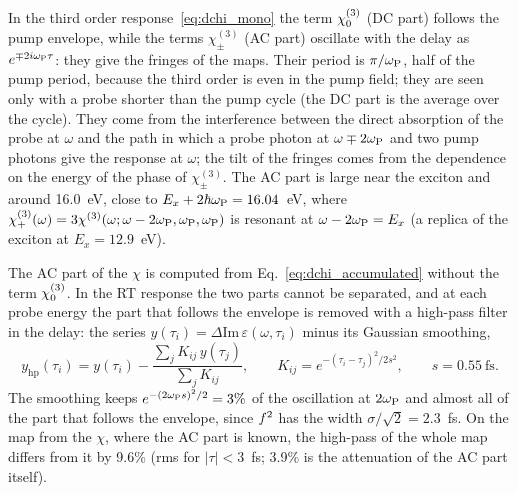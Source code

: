 \documentclass[10pt,a4paper]{paper}
\begin{document}
In the third order response~\eqref{eq:dchi_mono} the term $\chi^{(3)}_{0}$ (DC part) follows the pump envelope, while the
terms $\chi^{(3)}_\pm$ (AC part) oscillate with the delay as $e^{\mp2i\omega_{\mathrm{P}}\tau}$: they give the fringes of the maps.
Their period is $\pi/\omega_{\mathrm{P}}$, half of the pump period, because the third order is even in the pump field; they are seen
only with a probe shorter than the pump cycle (the DC part is the average over the cycle). They come from the
interference between the direct absorption of the probe at $\omega$ and the path in which a probe photon at
$\omega\mp2\omega_{\mathrm{P}}$ and two pump photons give the response at $\omega$; the tilt of the fringes comes from the dependence on
the energy of the phase of $\chi^{(3)}_\pm$. The AC part is large near the exciton and around 16.0~eV, close to
$E_x+2\hbar\omega_{\mathrm{P}} = 16.04$~eV, where $\chi^{(3)}_{+}(\omega) = 3\chi^{(3)}(\omega;\omega-2\omega_{\mathrm{P}},\omega_{\mathrm{P}},\omega_{\mathrm{P}})$ is resonant at
$\omega-2\omega_{\mathrm{P}} = E_x$ (a replica of the exciton at $E_x = 12.9$~eV).

The AC part of the $\chi$ is computed from Eq.~\eqref{eq:dchi_accumulated} without the term $\chi^{(3)}_{0}$. In the RT response
the two parts cannot be separated, and at each probe energy the part that follows the envelope is removed with a
high-pass filter in the delay: the series $y(\tau_i) = \Delta\mathrm{Im}\,\varepsilon(\omega,\tau_i)$ minus its Gaussian
smoothing,
\begin{equation}
y_{\mathrm{hp}}(\tau_i) = y(\tau_i) - \frac{\sum_jK_{ij}\,y(\tau_j)}{\sum_jK_{ij}} , \qquad
K_{ij} = e^{-(\tau_i-\tau_j)^2/2s^2} , \qquad s = 0.55~\mathrm{fs} .
\label{eq:highpass}
\end{equation}
The smoothing keeps $e^{-(2\omega_{\mathrm{P}} s)^2/2} = 3\%$ of the oscillation at $2\omega_{\mathrm{P}}$ and almost all of the part that follows the
envelope, since $f^2$ has the width $\sigma/\sqrt2 = 2.3$~fs. On the map from the $\chi$, where the AC part is known,
the high-pass of the whole map differs from it by 9.6\% (rms for $|\tau| < 3$~fs; 3.9\% is the attenuation of the AC
part itself).
\end{document}
